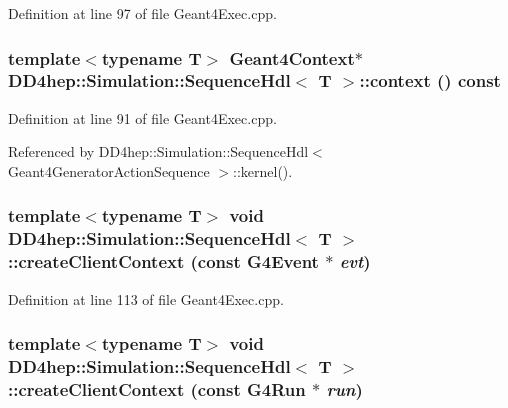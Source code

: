 Definition at line 97 of file Geant4Exec.cpp.\hypertarget{class_d_d4hep_1_1_simulation_1_1_sequence_hdl_ada6e54e8d3522cb4d0a221f630990cf3}{
\subsubsection[{context}]{\setlength{\rightskip}{0pt plus 5cm}template$<$typename T$>$ {\bf Geant4Context}$\ast$ {\bf DD4hep::Simulation::SequenceHdl}$<$ {\bf T} $>$::context () const}}
\label{class_d_d4hep_1_1_simulation_1_1_sequence_hdl_ada6e54e8d3522cb4d0a221f630990cf3}


Definition at line 91 of file Geant4Exec.cpp.

Referenced by DD4hep::Simulation::SequenceHdl$<$ Geant4GeneratorActionSequence $>$::kernel().\hypertarget{class_d_d4hep_1_1_simulation_1_1_sequence_hdl_a45cfca253c17c4a89ef63d9367d4c9a4}{
\subsubsection[{createClientContext}]{\setlength{\rightskip}{0pt plus 5cm}template$<$typename T$>$ void {\bf DD4hep::Simulation::SequenceHdl}$<$ {\bf T} $>$::createClientContext (const G4Event $\ast$ {\em evt})}}
\label{class_d_d4hep_1_1_simulation_1_1_sequence_hdl_a45cfca253c17c4a89ef63d9367d4c9a4}


Definition at line 113 of file Geant4Exec.cpp.\hypertarget{class_d_d4hep_1_1_simulation_1_1_sequence_hdl_a6f817d21c75a96ad450c35fd4748d762}{
\subsubsection[{createClientContext}]{\setlength{\rightskip}{0pt plus 5cm}template$<$typename T$>$ void {\bf DD4hep::Simulation::SequenceHdl}$<$ {\bf T} $>$::createClientContext (const G4Run $\ast$ {\em run})}}
\label{class_d_d4hep_1_1_simulation_1_1_sequence_hdl_a6f817d21c75a96ad450c35fd4748d762}


